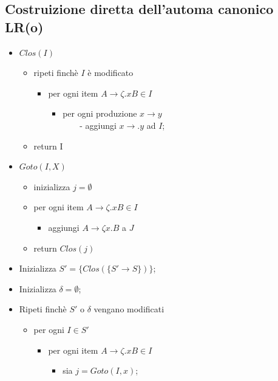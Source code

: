 \documentclass[a4paper,12pt]{article}
\begin{document}
{\subsection{Costruizione diretta dell'automa canonico LR(o)}
\begin{itemize}
  \item $Clos(I)$
  \begin{itemize}
    \item ripeti finchè $I$ è modificato
    \begin{itemize}
      \item per ogni item $A \to \zeta . xB \in I$
      \begin{itemize}
        \item per ogni produzione $x \to y$ \\
        $\quad \quad $- aggiungi $x \to .y$ ad $I$;
      \end{itemize}
    \end{itemize}
    \item return I
  \end{itemize}
\end{itemize}
\begin{itemize}
  \item $Goto(I, X)$
  \begin{itemize}
    \item inizializza $j = \emptyset$
    \item per ogni item $A \to \zeta . xB \in I$
    \begin{itemize}
      \item aggiungi $A \to \zeta x.B$ a $J$
    \end{itemize}
    \item return $Clos(j)$
  \end{itemize}
\end{itemize}
\vspace{1em}
\begin{itemize}
  \item Inizializza $S' = \{Clos(\{S' \to S\})\}$;
  \item Inizializza $\delta = \emptyset$;
  \item Ripeti finchè $S'$ o $\delta$ vengano modificati
  \begin{itemize}
    \item per ogni $I \in S'$
    \begin{itemize}
      \item per ogni item $A \to \zeta .x B \in I$
      \begin{itemize}
        \item sia $j = Goto(I,x)$;

\end{itemize}
\end{itemize}
\end{itemize}
\end{itemize}}
\end{document}
